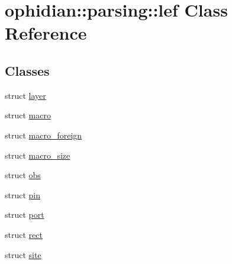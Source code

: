 \hypertarget{classophidian_1_1parsing_1_1lef}{\section{ophidian\-:\-:parsing\-:\-:lef Class Reference}
\label{classophidian_1_1parsing_1_1lef}
}
\subsection*{Classes}
\begin{DoxyCompactItemize}
\item 
struct \hyperlink{structophidian_1_1parsing_1_1lef_1_1layer}{layer}
\item 
struct \hyperlink{structophidian_1_1parsing_1_1lef_1_1macro}{macro}
\item 
struct \hyperlink{structophidian_1_1parsing_1_1lef_1_1macro__foreign}{macro\-\_\-foreign}
\item 
struct \hyperlink{structophidian_1_1parsing_1_1lef_1_1macro__size}{macro\-\_\-size}
\item 
struct \hyperlink{structophidian_1_1parsing_1_1lef_1_1obs}{obs}
\item 
struct \hyperlink{structophidian_1_1parsing_1_1lef_1_1pin}{pin}
\item 
struct \hyperlink{structophidian_1_1parsing_1_1lef_1_1port}{port}
\item 
struct \hyperlink{structophidian_1_1parsing_1_1lef_1_1rect}{rect}
\item 
struct \hyperlink{structophidian_1_1parsing_1_1lef_1_1site}{site}
\end{DoxyCompactItemize}
